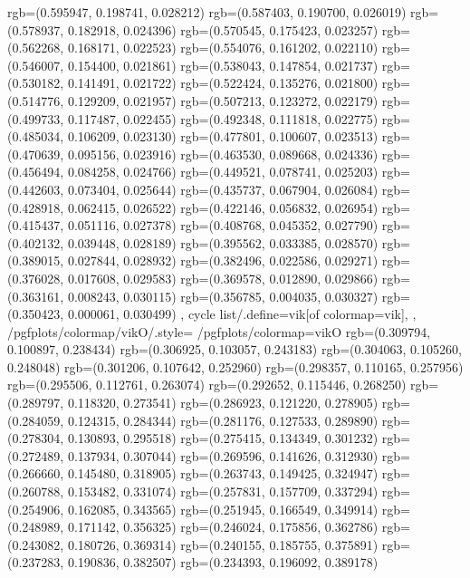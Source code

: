 {{{					rgb=(0.595947, 0.198741, 0.028212)
					rgb=(0.587403, 0.190700, 0.026019)
					rgb=(0.578937, 0.182918, 0.024396)
					rgb=(0.570545, 0.175423, 0.023257)
					rgb=(0.562268, 0.168171, 0.022523)
					rgb=(0.554076, 0.161202, 0.022110)
					rgb=(0.546007, 0.154400, 0.021861)
					rgb=(0.538043, 0.147854, 0.021737)
					rgb=(0.530182, 0.141491, 0.021722)
					rgb=(0.522424, 0.135276, 0.021800)
					rgb=(0.514776, 0.129209, 0.021957)
					rgb=(0.507213, 0.123272, 0.022179)
					rgb=(0.499733, 0.117487, 0.022455)
					rgb=(0.492348, 0.111818, 0.022775)
					rgb=(0.485034, 0.106209, 0.023130)
					rgb=(0.477801, 0.100607, 0.023513)
					rgb=(0.470639, 0.095156, 0.023916)
					rgb=(0.463530, 0.089668, 0.024336)
					rgb=(0.456494, 0.084258, 0.024766)
					rgb=(0.449521, 0.078741, 0.025203)
					rgb=(0.442603, 0.073404, 0.025644)
					rgb=(0.435737, 0.067904, 0.026084)
					rgb=(0.428918, 0.062415, 0.026522)
					rgb=(0.422146, 0.056832, 0.026954)
					rgb=(0.415437, 0.051116, 0.027378)
					rgb=(0.408768, 0.045352, 0.027790)
					rgb=(0.402132, 0.039448, 0.028189)
					rgb=(0.395562, 0.033385, 0.028570)
					rgb=(0.389015, 0.027844, 0.028932)
					rgb=(0.382496, 0.022586, 0.029271)
					rgb=(0.376028, 0.017608, 0.029583)
					rgb=(0.369578, 0.012890, 0.029866)
					rgb=(0.363161, 0.008243, 0.030115)
					rgb=(0.356785, 0.004035, 0.030327)
					rgb=(0.350423, 0.000061, 0.030499)
			},
		cycle list/.define={vik}{[of colormap=vik]},
		},
		/pgfplots/colormap/vikO/.style={
			/pgfplots/colormap={vikO}{%
					rgb=(0.309794, 0.100897, 0.238434)
					rgb=(0.306925, 0.103057, 0.243183)
					rgb=(0.304063, 0.105260, 0.248048)
					rgb=(0.301206, 0.107642, 0.252960)
					rgb=(0.298357, 0.110165, 0.257956)
					rgb=(0.295506, 0.112761, 0.263074)
					rgb=(0.292652, 0.115446, 0.268250)
					rgb=(0.289797, 0.118320, 0.273541)
					rgb=(0.286923, 0.121220, 0.278905)
					rgb=(0.284059, 0.124315, 0.284344)
					rgb=(0.281176, 0.127533, 0.289890)
					rgb=(0.278304, 0.130893, 0.295518)
					rgb=(0.275415, 0.134349, 0.301232)
					rgb=(0.272489, 0.137934, 0.307044)
					rgb=(0.269596, 0.141626, 0.312930)
					rgb=(0.266660, 0.145480, 0.318905)
					rgb=(0.263743, 0.149425, 0.324947)
					rgb=(0.260788, 0.153482, 0.331074)
					rgb=(0.257831, 0.157709, 0.337294)
					rgb=(0.254906, 0.162085, 0.343565)
					rgb=(0.251945, 0.166549, 0.349914)
					rgb=(0.248989, 0.171142, 0.356325)
					rgb=(0.246024, 0.175856, 0.362786)
					rgb=(0.243082, 0.180726, 0.369314)
					rgb=(0.240155, 0.185755, 0.375891)
					rgb=(0.237283, 0.190836, 0.382507)
					rgb=(0.234393, 0.196092, 0.389178)
}}}
